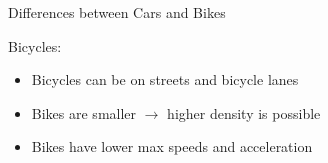 \begin{frame}{Differences between Cars and Bikes}
\vspace{-1cm}
        \begin{multicols}{2}
        Bicycles:
        \begin{itemize}
        \setlength\itemsep{1mm}
            \item<2->[-] Bicycles can be on streets and bicycle lanes
            \item<3->[-] Bikes are smaller $\rightarrow$ higher density is possible
            \item<4->[-] Bikes have lower max speeds and acceleration
        \end{itemize}
       
        \columnbreak
        \mbox{}
	\end{multicols}
\end{frame}
